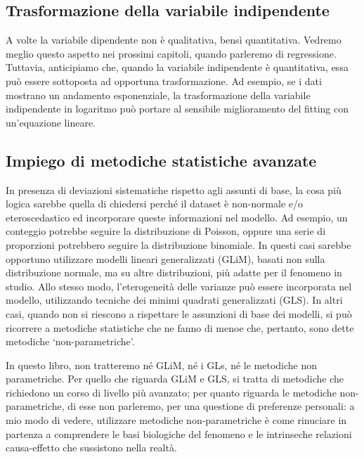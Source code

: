 \documentclass[a4paper,12pt,oneside]{book}
\begin{document}
\hypertarget{trasformazione-della-variabile-indipendente}{%
\subsection{Trasformazione della variabile indipendente}\label{trasformazione-della-variabile-indipendente}}

A volte la variabile dipendente non è qualitativa, bensì quantitativa. Vedremo meglio questo aspetto nei prossimi capitoli, quando parleremo di regressione. Tuttavia, anticipiamo che, quando la variabile indipendente è quantitativa, essa può essere sottoposta ad opportuna trasformazione. Ad esempio, se i dati mostrano un andamento esponenziale, la trasformazione della variabile indipendente in logaritmo può portare al sensibile miglioramento del fitting con un'equazione lineare.

\hypertarget{impiego-di-metodiche-statistiche-avanzate}{%
\subsection{Impiego di metodiche statistiche avanzate}\label{impiego-di-metodiche-statistiche-avanzate}}

In presenza di deviazioni sistematiche rispetto agli assunti di base, la cosa più logica sarebbe quella di chiedersi perché il dataset è non-normale e/o eteroscedastico ed incorporare queste informazioni nel modello. Ad esempio, un conteggio potrebbe seguire la distribuzione di Poisson, oppure una serie di proporzioni potrebbero seguire la distribuzione binomiale. In questi casi sarebbe opportuno utilizzare modelli lineari generalizzati (GLiM), basati non sulla distribuzione normale, ma su altre distribuzioni, più adatte per il fenomeno in studio. Allo stesso modo, l'eterogeneità delle varianze può essere incorporata nel modello, utilizzando tecniche dei minimi quadrati generalizzati (GLS). In altri casi, quando non si riescono a rispettare le assunzioni di base dei modelli, si può ricorrere a metodiche statistiche che ne fanno di menoe che, pertanto, sono dette metodiche `non-parametriche'.

In questo libro, non tratteremo né GLiM, né i GLs, né le metodiche non parametriche. Per quello che riguarda GLiM e GLS, si tratta di metodiche che richiedono un corso di livello più avanzato; per quanto riguarda le metodiche non-parametriche, di esse non parleremo, per una questione di preferenze personali: a mio modo di vedere, utilizzare metodiche non-parametriche è come rinuciare in partenza a comprendere le basi biologiche del fenomeno e le intrinseche relazioni causa-effetto che sussistono nella realtà.
\end{document}
